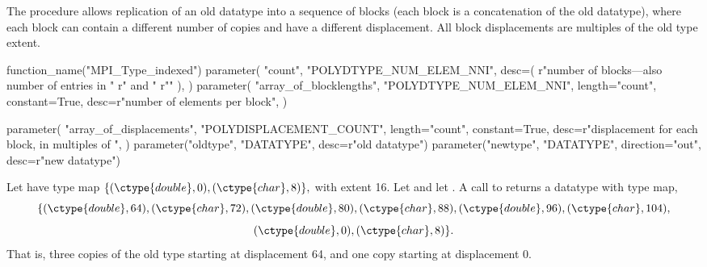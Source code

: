 The procedure
 allows
replication of an old datatype into a sequence of blocks (each block is
a concatenation of the old datatype), where
each block can contain a different number of copies and have a different
displacement.  All block displacements are multiples of the old type
extent.

\begin{mpi-binding}
    function_name("MPI_Type_indexed")
    parameter(
        "count",
        "POLYDTYPE_NUM_ELEM_NNI",
        desc=(
            r"number of blocks---also number of entries in "
            r" and "
            r""
        ),
    )
    parameter(
        "array_of_blocklengths",
        "POLYDTYPE_NUM_ELEM_NNI",
        length="count",
        constant=True,
        desc=r"number of elements per block",
    )

    parameter(
        "array_of_displacements",
        "POLYDISPLACEMENT_COUNT",
        length="count",
        constant=True,
        desc=r"displacement for each block, in multiples of ",
    )
    parameter("oldtype", "DATATYPE", desc=r"old datatype")
    parameter("newtype", "DATATYPE", direction="out", desc=r"new datatype")
\end{mpi-binding}


\begin{example}
\label{pt2pt-exU}
%
%
Let  have type map
\(
\{ (\ctype{double}, 0), (\ctype{char}, 8) \} ,
\)
with extent 16.
Let   and let .  A call to
 returns a datatype with
type map,
\begin{displaymath}
\{
(\ctype{double}, 64), (\ctype{char}, 72), (\ctype{double}, 80), (\ctype{char},
88), (\ctype{double}, 96), (\ctype{char}, 104),
\end{displaymath}
\begin{displaymath}
(\ctype{double}, 0), (\ctype{char}, 8)
\} .
\end{displaymath}
That is, three copies of the old type starting at displacement
64, and one copy starting at displacement 0.
\end{example}

